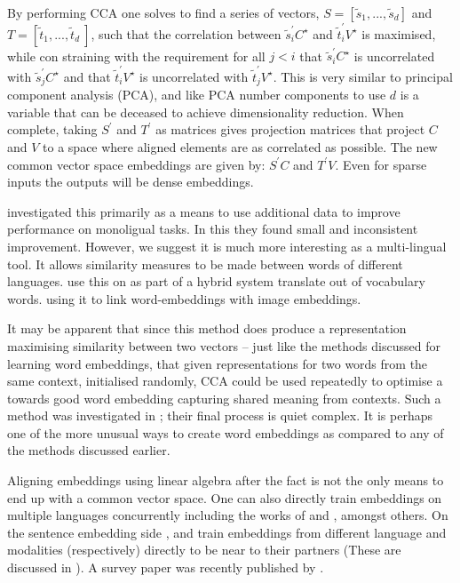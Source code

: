\documentclass[parskip]{komatufte}
\begin{document}
%
By performing CCA one solves to find a series of vectors, $S=\left[ \tilde{s}_1, ..., \tilde{s}_d \right]$ and $T= \left[ \tilde{t}_1, ..., \tilde{t}_d\ \right]$,
such that the correlation between $\tilde{s}_i^\prime C^\star$ and $\tilde{t}_i^\prime V^\star$ is maximised,
while con straining with the requirement for all $j<i$ that $\tilde{s}_i^\prime C^\star$ is uncorrelated with $\tilde{s}_j^\prime C^\star$  and that  $\tilde{t}_i^\prime V^\star$ is uncorrelated with $\tilde{t}_j^\prime V^\star$.
This is very similar to principal component analysis (PCA), and like PCA number components to use $d$ is a variable that can be deceased to achieve dimensionality reduction.
When complete, taking $S^\prime$ and $T^\prime$ as matrices gives projection matrices that project $C$ and $V$ to a space where aligned elements are as correlated as possible.
The new common vector space embeddings are given by:
$S^\prime C$ and $T^\prime V$.
Even for sparse inputs the outputs will be dense embeddings.

\textcite{faruqui2014improving} investigated this primarily as a means to use additional data to improve performance on monoligual tasks.
In this they found small and inconsistent improvement.
However, we suggest it is much more interesting as a multi-lingual tool.
It allows similarity measures to be made between words of different languages.
 use this on as part of a hybrid system translate out of vocabulary words.
 using it to link word-embeddings with image embeddings.


It may be apparent that since this method does produce a representation maximising similarity between two vectors -- just like the methods discussed for learning word embeddings,
that given representations for two words from the same context, initialised randomly,
CCA could be used repeatedly to optimise a towards good word embedding capturing shared meaning from contexts.
Such a method was investigated in ; their final process is quiet complex.
It is perhaps one of the more unusual ways to create word embeddings as compared to any of the methods discussed earlier.

Aligning embeddings using linear algebra after the fact is not the only means to end up with a common vector space.
One can also directly train embeddings on multiple languages concurrently including the works of  and , amongst others.
On the sentence embedding side , and  train embeddings from different language and modalities (respectively) directly to be near to their partners (These are discussed in ).
A survey paper was recently published by \textcite{Ruder17crosslingreview}.


\end{document}

